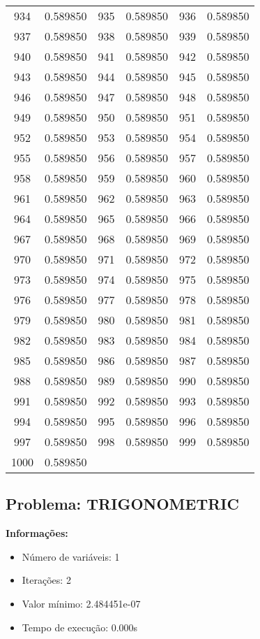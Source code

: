 \documentclass[12pt]{article}
\begin{document}
\begin{longtable}{@{}cc|cc|cc@{}}
934 & 0.589850 & 935 & 0.589850 & 936 & 0.589850 \\
937 & 0.589850 & 938 & 0.589850 & 939 & 0.589850 \\
940 & 0.589850 & 941 & 0.589850 & 942 & 0.589850 \\
943 & 0.589850 & 944 & 0.589850 & 945 & 0.589850 \\
946 & 0.589850 & 947 & 0.589850 & 948 & 0.589850 \\
949 & 0.589850 & 950 & 0.589850 & 951 & 0.589850 \\
952 & 0.589850 & 953 & 0.589850 & 954 & 0.589850 \\
955 & 0.589850 & 956 & 0.589850 & 957 & 0.589850 \\
958 & 0.589850 & 959 & 0.589850 & 960 & 0.589850 \\
961 & 0.589850 & 962 & 0.589850 & 963 & 0.589850 \\
964 & 0.589850 & 965 & 0.589850 & 966 & 0.589850 \\
967 & 0.589850 & 968 & 0.589850 & 969 & 0.589850 \\
970 & 0.589850 & 971 & 0.589850 & 972 & 0.589850 \\
973 & 0.589850 & 974 & 0.589850 & 975 & 0.589850 \\
976 & 0.589850 & 977 & 0.589850 & 978 & 0.589850 \\
979 & 0.589850 & 980 & 0.589850 & 981 & 0.589850 \\
982 & 0.589850 & 983 & 0.589850 & 984 & 0.589850 \\
985 & 0.589850 & 986 & 0.589850 & 987 & 0.589850 \\
988 & 0.589850 & 989 & 0.589850 & 990 & 0.589850 \\
991 & 0.589850 & 992 & 0.589850 & 993 & 0.589850 \\
994 & 0.589850 & 995 & 0.589850 & 996 & 0.589850 \\
997 & 0.589850 & 998 & 0.589850 & 999 & 0.589850 \\
1000 & 0.589850 &  &  &  &  \\

\end{longtable}


\newpage            
\subsection{Problema: TRIGONOMETRIC}

\textbf{Informações:}
\begin{itemize}
\item Número de variáveis: 1
\item Iterações: 2
\item Valor mínimo: 2.484451e-07
\item Tempo de execução: 0.000s
\end{itemize}
\end{document}
